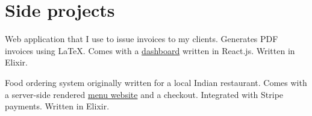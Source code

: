 \section{Side projects}
\vspace*{-6pt}


\small
Web application that I use to issue invoices to my clients. Generates PDF invoices using \LaTeX.
Comes with a \href{https://app.faktury.wtf}{dashboard} written in React.js. Written in Elixir.


\small
Food ordering system originally written for a local Indian restaurant. Comes with a server-side rendered
\href{https://demo.samosa.cc}{menu website} and a checkout. Integrated with Stripe payments. Written in Elixir.
